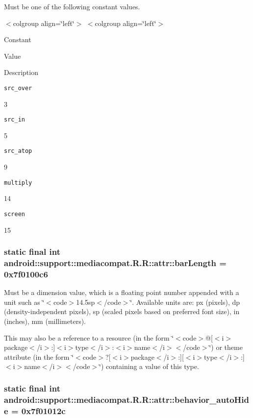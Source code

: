 Must be one of the following constant values. \begin{TabularC}{0}
\hline
\end{TabularC}
$<$colgroup align=\char`\"{}left\char`\"{}$>$ $<$colgroup align=\char`\"{}left\char`\"{}$>$ 

Constant

Value

Description 

{\tt src\_\-over}

3

{\tt src\_\-in}

5

{\tt src\_\-atop}

9

{\tt multiply}

14

{\tt screen}

15\hypertarget{classandroid_1_1support_1_1mediacompat_1_1_r_1_1attr_11265b6ca32462473e044751ff57c289}{
\subsubsection[{barLength}]{\setlength{\rightskip}{0pt plus 5cm}static final int android::support::mediacompat.R.R::attr::barLength = 0x7f0100c6}}
\label{classandroid_1_1support_1_1mediacompat_1_1_r_1_1attr_11265b6ca32462473e044751ff57c289}


Must be a dimension value, which is a floating point number appended with a unit such as \char`\"{}$<$code$>$14.5sp$<$/code$>$\char`\"{}. Available units are: px (pixels), dp (density-independent pixels), sp (scaled pixels based on preferred font size), in (inches), mm (millimeters). 

This may also be a reference to a resource (in the form \char`\"{}$<$code$>$@\mbox{[}$<$i$>$package$<$/i$>$:\mbox{]}$<$i$>$type$<$/i$>$:$<$i$>$name$<$/i$>$$<$/code$>$\char`\"{}) or theme attribute (in the form \char`\"{}$<$code$>$?\mbox{[}$<$i$>$package$<$/i$>$:\mbox{]}\mbox{[}$<$i$>$type$<$/i$>$:\mbox{]}$<$i$>$name$<$/i$>$$<$/code$>$\char`\"{}) containing a value of this type. \hypertarget{classandroid_1_1support_1_1mediacompat_1_1_r_1_1attr_7e388b0737392eaeeea64902b01a7615}{
\subsubsection[{behavior\_\-autoHide}]{\setlength{\rightskip}{0pt plus 5cm}static final int android::support::mediacompat.R.R::attr::behavior\_\-autoHide = 0x7f01012c}}
\label{classandroid_1_1support_1_1mediacompat_1_1_r_1_1attr_7e388b0737392eaeeea64902b01a7615}


